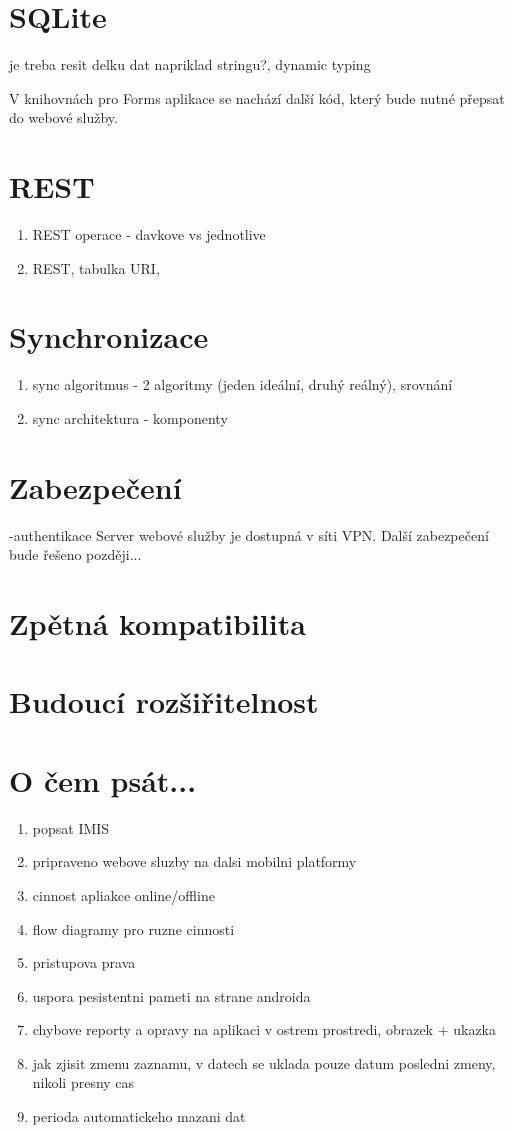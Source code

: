 \documentclass{bakalarka}
\begin{document}
\section{SQLite}
je treba resit delku dat napriklad stringu?, dynamic typing

V knihovnách pro Forms aplikace se nachází další kód, který bude nutné přepsat do webové služby.
\section{REST}
\begin{enumerate}
\item REST operace - davkove vs jednotlive
\item REST, tabulka URI, 
\end{enumerate}

\section{Synchronizace}
\begin{enumerate}
\item sync algoritmus - 2 algoritmy (jeden ideální, druhý reálný), srovnání
\item sync architektura - komponenty
\end{enumerate}

\section{Zabezpečení}
-authentikace
Server webové služby je dostupná v síti VPN. Další zabezpečení bude řešeno později...

\section{Zpětná kompatibilita}

\section{Budoucí rozšiřitelnost}

\section{O čem psát...}
\begin{enumerate}
\item popsat IMIS 
\item pripraveno webove sluzby na dalsi mobilni platformy
\item cinnost apliakce online/offline
\item flow diagramy pro ruzne cinnosti
\item pristupova prava
\item uspora pesistentni pameti na strane androida
\item chybove reporty a opravy na aplikaci v ostrem prostredi, obrazek + ukazka
\item jak zjisit zmenu zaznamu, v datech se uklada pouze datum posledni zmeny, nikoli presny cas
\item perioda automatickeho mazani dat
\end{enumerate}

\appendix

%
\end{document}
